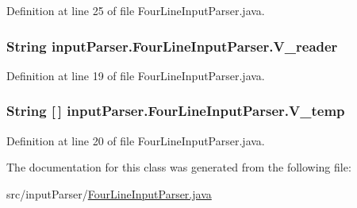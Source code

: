 Definition at line 25 of file Four\-Line\-Input\-Parser.\-java.

\hypertarget{classinput_parser_1_1_four_line_input_parser_ab32a6cf6e1398b4d6df4cde2036dfc82}{
\subsubsection[{V\-\_\-reader}]{\setlength{\rightskip}{0pt plus 5cm}String {\bf input\-Parser.\-Four\-Line\-Input\-Parser.\-V\-\_\-reader}}}\label{classinput_parser_1_1_four_line_input_parser_ab32a6cf6e1398b4d6df4cde2036dfc82}


Definition at line 19 of file Four\-Line\-Input\-Parser.\-java.

\hypertarget{classinput_parser_1_1_four_line_input_parser_a70d648d67b885eeef32f47162ffa81ae}{
\subsubsection[{V\-\_\-temp}]{\setlength{\rightskip}{0pt plus 5cm}String \mbox{[}$\,$\mbox{]} {\bf input\-Parser.\-Four\-Line\-Input\-Parser.\-V\-\_\-temp}}}\label{classinput_parser_1_1_four_line_input_parser_a70d648d67b885eeef32f47162ffa81ae}


Definition at line 20 of file Four\-Line\-Input\-Parser.\-java.



The documentation for this class was generated from the following file\-:\begin{DoxyCompactItemize}
\item 
src/input\-Parser/\hyperlink{_four_line_input_parser_8java}{Four\-Line\-Input\-Parser.\-java}\end{DoxyCompactItemize}
